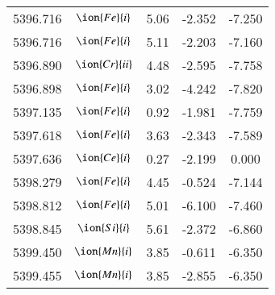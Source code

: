 \documentclass[fleqn,usenatbib]{mnras}
\begin{document}
\begin{center}
\begin{table}
\begin{tabular}{ccccc}
5396.716 &  $\ion{Fe}{i}$  & 5.06 & -2.352 & -7.250 \\ 
5396.716 &  $\ion{Fe}{i}$  & 5.11 & -2.203 & -7.160 \\ 
5396.890 &  $\ion{Cr}{ii}$  & 4.48 & -2.595 & -7.758 \\ 
5396.898 &  $\ion{Fe}{i}$  & 3.02 & -4.242 & -7.820 \\ 
5397.135 &  $\ion{Fe}{i}$  & 0.92 & -1.981 & -7.759 \\ 
5397.618 &  $\ion{Fe}{i}$  & 3.63 & -2.343 & -7.589 \\ 
5397.636 &  $\ion{Ce}{i}$  & 0.27 & -2.199 & 0.000 \\ 
5398.279 &  $\ion{Fe}{i}$  & 4.45 & -0.524 & -7.144 \\ 
5398.812 &  $\ion{Fe}{i}$  & 5.01 & -6.100 & -7.460 \\ 
5398.845 &  $\ion{Si}{i}$  & 5.61 & -2.372 & -6.860 \\ 
5399.450 &  $\ion{Mn}{i}$  & 3.85 & -0.611 & -6.350 \\ 
5399.455 &  $\ion{Mn}{i}$  & 3.85 & -2.855 & -6.350 \\ 
 \end{tabular}
 \end{table}
 \end{center}
 
\end{document}
